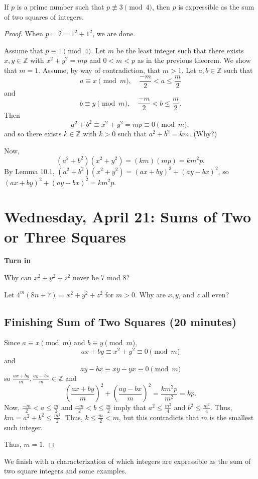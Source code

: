 \documentclass[letterpaper, 11 pt]{article}
\begin{document}
\begin{thm}[Theorem 10.2]
 If $p$ is a prime number such that $p\not\equiv 3\pmod 4$, then $p$ is expressible as the sum of two squares of integers.
\end{thm}
\begin{proof}
 When $p=2=1^2+1^2$, we are done.
 
 Assume that $p\equiv 1\pmod 4$. Let $m$ be the least integer such that there exists $x,y\in\mathbb{Z}$ with $x^2+y^2=mp$ and $0<m<p$ as in the previous theorem. We show that $m=1$. Assume, by way of contradiction, that $m>1$. Let $a,b\in\mathbb{Z}$ such that \[a\equiv x\pmod m,\quad \frac{-m}{2}<a\leq\frac{m}{2}\] and \[b\equiv y\pmod m,\quad \frac{-m}{2}<b\leq\frac{m}{2}.\] Then \[a^2+b^2\equiv x^2+y^2=mp\equiv 0\pmod m,\] and so there exists $k\in\mathbb{Z}$ with $k>0$ such that $a^2+b^2=km$. (Why?)
 
 Now, \[(a^2+b^2)(x^2+y^2)=(km)(mp)=km^2p.\] By Lemma 10.1, $(a^2+b^2)(x^2+y^2)=(ax+by)^2+(ay-bx)^2$, so $(ax+by)^2+(ay-bx)^2=km^2p$. 
 
\section{Wednesday, April 21: Sums of Two or Three Squares}
{\bf Turn in }

Why can $x^2+y^2+z^2$  never be 7 mod 8?

Let $4^m(8n+7)=x^2+y^2+z^2$ for $m>0$. Why are $x,y$, and $z$ all even?
\subsection{Finishing Sum of Two Squares (20 minutes)}
 
 Since $a\equiv x\pmod m$ and $b\equiv y\pmod m$, \[ax+by\equiv x^2+y^2\equiv0\pmod m\] and \[ay-bx\equiv xy-yx\equiv0\pmod m\] so $\frac{ax+by}{m},\frac{ay-bx}{m}\in\mathbb{Z}$ and \[\left(\frac{ax+by}{m}\right)^2+\left(\frac{ay-bx}{m}\right)^2=\frac{km^2p}{m^2}=kp.\]  Now, $\frac{-m}{2}<a\leq\frac{m}{2}$ and $\frac{-m}{2}<b\leq\frac{m}{2}$  imply that $a^2\leq\frac{m^2}{4}$ and $b^2\leq\frac{m^2}{4}$. Thus, $km=a^2+b^2\leq\frac{m^2}{2}$. Thus, $k\leq \frac{m}{2}<m$, but this contradicts that $m$ is the smallest such integer.
 
 Thus, $m=1$.
\end{proof}

We finish with a characterization of which integers are expressible as the sum of two square integers and some examples.
\end{document}
